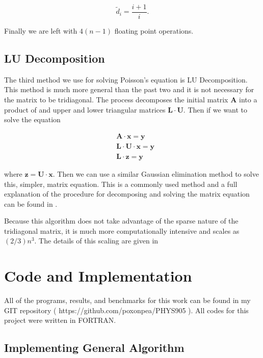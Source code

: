 \documentclass[%
oneside,                 %
final,                   %
10pt]{article}
\begin{document}
\begin{equation*}
\tilde{d}_i=\frac{i+1}{i}.
\end{equation*}

Finally we are left with $4(n-1)$ floating point operations.

\subsection{LU Decomposition}

The third method we use for solving Poisson's equation is LU Decomposition.  This method is much more general than the past two and it is not necessary for the matrix to be tridiagonal. The process decomposes the initial matrix $\mathbf{A}$ into a product of and upper and lower triangular matrices $\mathbf{L} \cdot \mathbf{U}$.  Then if we want to solve the equation

\begin{equation*}
\begin{split}
&\mathbf{A} \cdot \mathbf{x} = \mathbf{y} \\
&\mathbf{L} \cdot \mathbf{U} \cdot \mathbf{x} = \mathbf{y}\\
& \mathbf{L} \cdot \mathbf{z} = \mathbf{y}
\end{split}
\end{equation*}

where $\mathbf{z}=\mathbf{U} \cdot \mathbf{x}$.  Then we can use a similar Gaussian elimination method to solve this, simpler, matrix equation.  This is a commonly used method and a full explanation of the procedure for decomposing and solving the matrix equation can be found in \cite{LectureNotes}.

Because this algorithm does not take advantage of the sparse nature of the tridiagonal matrix, it is much more computationally intensive and scales as $(2/3) n^3$.  The details of this scaling are given in \cite{Chiarandini}


\section{Code and Implementation}

All of the programs, results, and benchmarks for this work can be found in my GIT repository ( https://github.com/poxonpea/PHYS905 ).  All codes for this project were written in FORTRAN.

\subsection{Implementing General Algorithm}
\end{document}
